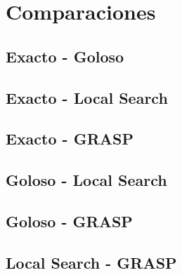 \section{Comparaciones}

\subsection{Exacto - Goloso}

\subsection{Exacto - Local Search}

\subsection{Exacto - GRASP}

\subsection{Goloso - Local Search}

\subsection{Goloso - GRASP}

\subsection{Local Search - GRASP}
